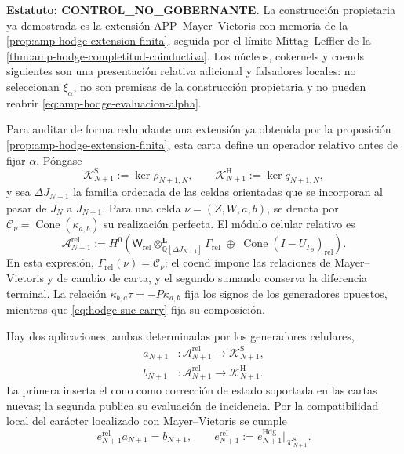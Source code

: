\noindent\textbf{Estatuto: CONTROL\_NO\_GOBERNANTE.}
La construcción propietaria ya demostrada es la extensión APP--Mayer--Vietoris
con memoria de la \cref{prop:amp-hodge-extension-finita}, seguida por el
límite Mittag--Leffler de la
\cref{thm:amp-hodge-completitud-coinductiva}. Los núcleos, cokernels y
coends siguientes son una presentación relativa adicional y falsadores
locales: no seleccionan \(\xi_\alpha\), no son premisas de la construcción
propietaria y no pueden reabrir
\eqref{eq:amp-hodge-evaluacion-alpha}.

Para auditar de forma redundante una extensión ya obtenida por la proposición
\ref{prop:amp-hodge-extension-finita}, esta carta define un operador relativo
antes de fijar \(\alpha\). Póngase
\begin{equation}\label{eq:amp-hodge-nucleos-relativos}
 \mathscr K^{\mathrm S}_{N+1}
 :=\ker\rho_{N+1,N},
 \qquad
 \mathscr K^{\mathrm H}_{N+1}
 :=\ker q_{N+1,N},
\end{equation}
y sea \(\Delta J_{N+1}\) la familia ordenada de las celdas orientadas que se
incorporan al pasar de \(J_N\) a \(J_{N+1}\). Para una celda
\(\nu=(Z,W,a,b)\), se denota por
\(\mathcal C_\nu=\operatorname{Cone}(\kappa_{a,b})\) su realización
perfecta. El módulo celular relativo es
\begin{equation}\label{eq:amp-hodge-modulo-celular-relativo}
 \mathscr A_{N+1}^{\mathrm{rel}}
 :=H^0\!\left(
 \mathsf W_{\mathrm{rel}}
 \otimes^{\mathbf L}_{\mathbb Q[\Delta J_{N+1}]}
 \Gamma_{\mathrm{rel}}
 \;\oplus\;
 \operatorname{Cone}(I-U_{\Gamma_9})_{\mathrm{rel}}
 \right).
\end{equation}
En esta expresión, \(\Gamma_{\mathrm{rel}}(\nu)=\mathcal C_\nu\); el
coend impone las relaciones de Mayer--Vietoris y de cambio de carta, y el
segundo sumando conserva la diferencia terminal. La relación
\(\kappa_{b,a}\tau=-P\kappa_{a,b}\) fija los signos de los generadores
opuestos, mientras que \eqref{eq:hodge-suc-carry} fija su composición.

Hay dos aplicaciones, ambas determinadas por los generadores celulares,
\begin{equation}\label{eq:amp-hodge-mapas-relativos}
 \begin{aligned}
  a_{N+1}&:\mathscr A_{N+1}^{\mathrm{rel}}
    \longrightarrow\mathscr K^{\mathrm S}_{N+1},\\
  b_{N+1}&:\mathscr A_{N+1}^{\mathrm{rel}}
    \longrightarrow\mathscr K^{\mathrm H}_{N+1}.
 \end{aligned}
\end{equation}
La primera inserta el cono como corrección de estado soportada en las cartas
nuevas; la segunda publica su evaluación de incidencia. Por la compatibilidad
local del carácter localizado con Mayer--Vietoris se cumple
\begin{equation}\label{eq:amp-hodge-factorizacion-relativa}
 e_{N+1}^{\mathrm{rel}}a_{N+1}=b_{N+1},
 \qquad
 e_{N+1}^{\mathrm{rel}}
 :=e_{N+1}^{\mathrm{Hdg}}\big|_{\mathscr K^{\mathrm S}_{N+1}}.
\end{equation}

